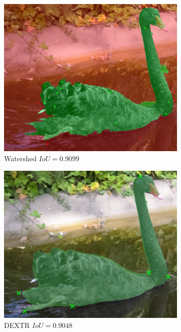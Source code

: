 \begin{figure}
\begin{subfigure}[t]{0.3\textwidth}
		\includegraphics[width=\textwidth]{figures/appendix/method_predictions/swan34_watershed.png}
		\caption{
			Watershed $ IoU = 0.9099 $
		}
	\end{subfigure}
	\hfill
	\begin{subfigure}[t]{0.3\textwidth}
		\centering
		\includegraphics[width=\textwidth]{figures/appendix/method_predictions/swan34_dextr.png}
		\caption{
			DEXTR $ IoU = 0.9048 $
		}
	\end{subfigure}
	\hfill
	\begin{subfigure}[t]{0.3\textwidth}

\end{subfigure}
\end{figure}
